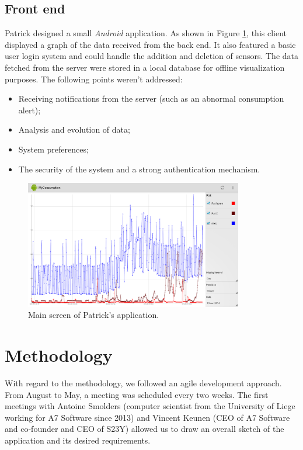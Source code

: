 \documentclass[a4paper, oneside, 11pt]{book}
\begin{document}
\subsection{Front end}
Patrick designed a small \textit{Android} application. As shown in Figure \ref{fig:patrick}, this client displayed a graph of the data received from the back end. It also featured a basic user login system and could handle the addition and deletion of sensors. The data fetched from the server were stored in a local database for offline visualization purposes. The following points weren’t addressed:
\begin{itemize}
	\item Receiving notifications from the server (such as an abnormal consumption alert);
	\item Analysis and evolution of data;
	\item System preferences;
	\item The security of the system and a strong authentication mechanism.
\end{itemize}

\begin{figure}[htbp]
	\centerline{\includegraphics[width=0.85\textwidth]{patrick.png}}
	\caption{Main screen of Patrick’s application.}
	\label{fig:patrick}
\end{figure}

\section{Methodology}
With regard to the methodology, we followed an agile development approach. From August to May, a meeting was scheduled every two weeks. The first meetings with Antoine Smolders (computer scientist from the University of Liege working for A7 Software since 2013) and Vincent Keunen (CEO of A7 Software and co-founder and CEO of S23Y) allowed us to draw an overall sketch of the application and its desired requirements.  \\
\end{document}
